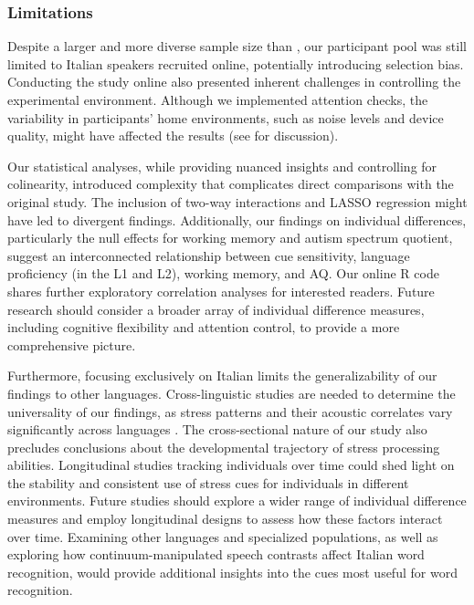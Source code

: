 \subsubsection{Limitations}

Despite a larger and more diverse sample size than \cite{Sulpizio_McQueen_2012}, our participant pool was still limited to Italian speakers recruited online, potentially introducing selection bias. Conducting the study online also presented inherent challenges in controlling the experimental environment. Although we implemented attention checks, the variability in participants' home environments, such as noise levels and device quality, might have affected the results (see \cite{bramlett_wiener_24-AOW} for discussion).

Our statistical analyses, while providing nuanced insights and controlling for colinearity, introduced complexity that complicates direct comparisons with the original study. The inclusion of two-way interactions and LASSO regression might have led to divergent findings. Additionally, our findings on individual differences, particularly the null effects for working memory and autism spectrum quotient, suggest an interconnected relationship between cue sensitivity, language proficiency (in the L1 and L2), working memory, and AQ. Our online R code shares further exploratory correlation analyses for interested readers. Future research should consider a broader array of individual difference measures, including cognitive flexibility and attention control, to provide a more comprehensive picture.

Furthermore, focusing exclusively on Italian limits the generalizability of our findings to other languages. Cross-linguistic studies are needed to determine the universality of our findings, as stress patterns and their acoustic correlates vary significantly across languages \cite{cutler2007dutch}. The cross-sectional nature of our study also precludes conclusions about the developmental trajectory of stress processing abilities. Longitudinal studies tracking individuals over time could shed light on the stability and consistent use of stress cues for individuals in different environments. Future studies should explore a wider range of individual difference measures and employ longitudinal designs to assess how these factors interact over time. Examining other languages and specialized populations, as well as exploring how continuum-manipulated speech contrasts affect Italian word recognition, would provide additional insights into the cues most useful for word recognition.

